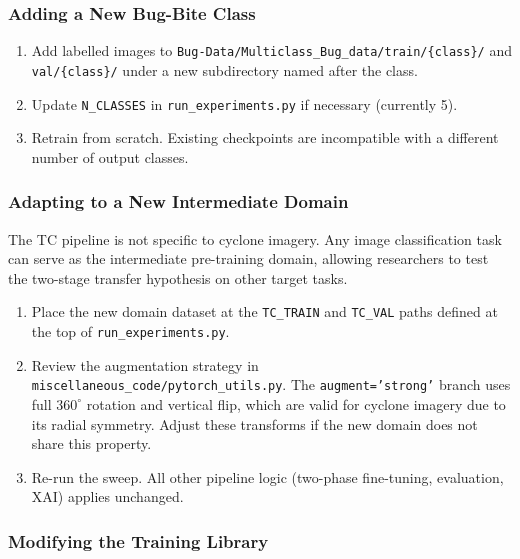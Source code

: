 \documentclass[12pt,a4paper]{article}
\begin{document}
\subsubsection{Adding a New Bug-Bite Class}

\begin{enumerate}
    \item Add labelled images to
          \texttt{Bug-Data/Multiclass\_Bug\_data/train/\{class\}/} and
          \texttt{val/\{class\}/} under a new subdirectory named after
          the class.
    \item Update \texttt{N\_CLASSES} in \texttt{run\_experiments.py} if
          necessary (currently 5).
    \item Retrain from scratch. Existing checkpoints are incompatible
          with a different number of output classes.
\end{enumerate}

\subsubsection{Adapting to a New Intermediate Domain}

The TC pipeline is not specific to cyclone imagery. Any image
classification task can serve as the intermediate pre-training domain,
allowing researchers to test the two-stage transfer hypothesis on other
target tasks.

\begin{enumerate}
    \item Place the new domain dataset at the \texttt{TC\_TRAIN} and
          \texttt{TC\_VAL} paths defined at the top of
          \texttt{run\_experiments.py}.
    \item Review the augmentation strategy in
          \texttt{miscellaneous\_code/pytorch\_utils.py}. The
          \texttt{augment='strong'} branch uses full $360^{\circ}$
          rotation and vertical flip, which are valid for cyclone imagery
          due to its radial symmetry. Adjust these transforms if the new
          domain does not share this property.
    \item Re-run the sweep. All other pipeline logic (two-phase
          fine-tuning, evaluation, XAI) applies unchanged.
\end{enumerate}

\subsubsection{Modifying the Training Library}
\end{document}
